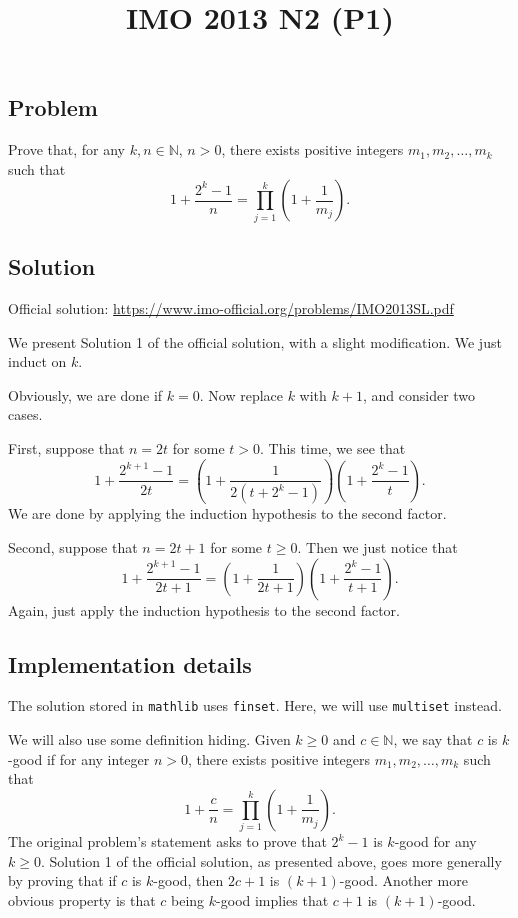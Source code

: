 \documentclass{article}
\title{IMO 2013 N2 (P1)}
\author{}
\date{}
\newcommand{\N}{\mathbb{N}}
\begin{document}
\maketitle



\subsection*{Problem}

Prove that, for any $k, n \in \N$, $n > 0$, there exists positive integers $m_1, m_2, \ldots, m_k$ such that
\[ 1 + \frac{2^k - 1}{n} = \prod_{j = 1}^k \left(1 + \frac{1}{m_j}\right). \tag{*}\label{2013n2-eq0} \]



\subsection*{Solution}

Official solution: \url{https://www.imo-official.org/problems/IMO2013SL.pdf}

We present Solution 1 of the official solution, with a slight modification.
We just induct on $k$.

Obviously, we are done if $k = 0$.
Now replace $k$ with $k + 1$, and consider two cases.

First, suppose that $n = 2t$ for some $t > 0$.
This time, we see that
\[ 1 + \frac{2^{k + 1} - 1}{2t} = \left(1 + \frac{1}{2(t + 2^k - 1)}\right) \left(1 + \frac{2^k - 1}{t}\right). \]
We are done by applying the induction hypothesis to the second factor.

Second, suppose that $n = 2t + 1$ for some $t \geq 0$.
Then we just notice that
\[ 1 + \frac{2^{k + 1} - 1}{2t + 1} = \left(1 + \frac{1}{2t + 1}\right) \left(1 + \frac{2^k - 1}{t + 1}\right). \]
Again, just apply the induction hypothesis to the second factor.



\subsection*{Implementation details}

The solution stored in \texttt{mathlib} uses \texttt{finset}.
Here, we will use \texttt{multiset} instead.

We will also use some definition hiding.
Given $k \geq 0$ and $c \in \N$, we say that $c$ is $k$-good if for any integer $n > 0$, there exists positive integers $m_1, m_2, \ldots, m_k$ such that
\[ 1 + \frac{c}{n} = \prod_{j = 1}^k \left(1 + \frac{1}{m_j}\right). \]
The original problem's statement asks to prove that $2^k - 1$ is $k$-good for any $k \geq 0$.
Solution 1 of the official solution, as presented above, goes more generally by proving that if $c$ is $k$-good, then $2c + 1$ is $(k + 1)$-good.
Another more obvious property is that $c$ being $k$-good implies that $c + 1$ is $(k + 1)$-good.
\end{document}
